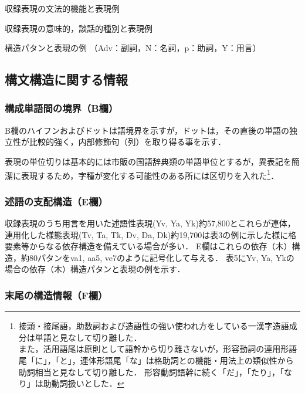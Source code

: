 \documentclass[japanese]{jnlp_1.4}
\begin{document}
\begin{table}[p]
\caption{収録表現の文法的機能と表現例}

\end{table}
\begin{table}[t]
\caption{収録表現の意味的，談話的種別と表現例}

\end{table}
\begin{table}[t]
\caption{構造パタンと表現の例 （Adv：副詞，N：名詞，p：助詞，Y：用言）}

\vspace{-0.5\baselineskip}
\end{table}


\subsection{構文構造に関する情報}

\subsubsection{構成単語間の境界（B欄）}

B欄のハイフンおよびドットは語境界を示すが，ドットは，その直後の単語の独立性が比較的強く，内部修飾句（列）を取り得る事を示す． 

表現の単位切りは基本的には市販の国語辞典類の単語単位とするが，異表記を簡潔に表現するため，字種が変化する可能性のある所には区切りを入れた\footnote{接頭・接尾語，助数詞および造語性の強い使われ方をしている一漢字造語成分は単語と見なして切り離した．\\
また，活用語尾は原則として語幹から切り離さないが，形容動詞の連用形語尾「に」，「と」，連体形語尾「な」は格助詞との機能・用法上の類似性から助詞相当と見なして切り離した．
形容動詞語幹に続く「だ」，「たり」，「なり」は助動詞扱いとした．}． 

\subsubsection{述語の支配構造（E欄）}

収録表現のうち用言を用いた述語性表現(Yv, Ya, Yk)約57,800とこれらが連体，連用化した様態表現(Tv, Ta, Tk, Dv, Da, Dk)約19,700は表3の例に示した様に格要素等からなる依存構造を備えている場合が多い．
E欄はこれらの依存（木）構造，約80パタンをva1, aa5, ve7のように記号化して与える．
表5にYv, Ya, Ykの場合の依存（木）構造パタンと表現の例を示す．

\clearpage


\subsubsection{末尾の構造情報（F欄）}
\end{document}
